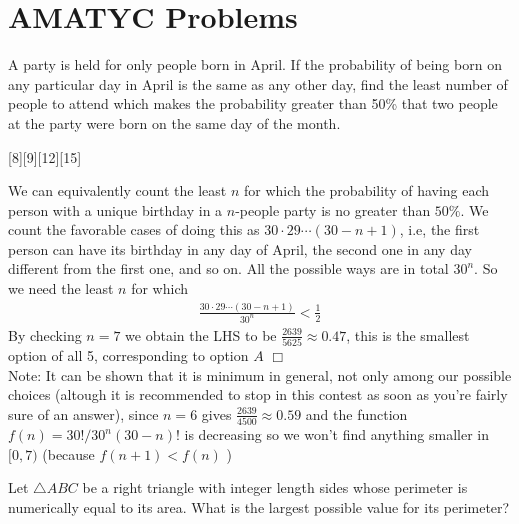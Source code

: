 




\sloppy
\maketitle

\section{AMATYC Problems}

\begin{problem}[A][3][Fall 2016 P13]
    A party is held for only people born in April. If the probability of being born on any particular day in April is the same as any other day, find the least number of people to attend which makes the probability greater than 50\% that two people at the party were born on the same day of the month.
\end{problem}
[8][9][12][15]

\begin{solution}[A]
    We can equivalently count the least $n$ for which the probability of having each person with a unique birthday in a $n$-people party is no greater than $50\%$.
    We count the favorable cases of doing this as $30 \cdot 29 \cdots (30-n+1)$, i.e, the first person can have its birthday in any day of April, the second one in any day different from the first one, and so on. All the possible ways are in total $30^n$. So we need the least $n$ for which
    \begin{align*}
        \frac{30 \cdot 29 \cdots (30-n+1)}{30^n} < \frac{1}{2}
    \end{align*}
    By checking $n=7$ we obtain the LHS to be $\frac{2639}{5625} \approx 0.47$, this is the smallest option of all 5, corresponding to option $A$ $\Box$ \\[3mm]
    Note: It can be shown that it is minimum in general, not only among our possible choices (altough it is recommended to stop in this contest as soon as you're fairly sure of an answer), since  $n=6$ gives $\frac{2639}{4500} \approx 0.59$ and the function $f(n) = 30!/30^n(30-n)!$ is decreasing so we won't find anything smaller in $[0,7)$ (because $f(n+1) < f(n)$ )
\end{solution}

\begin{problem}[A][4][Fall 2015 P11]
    Let $\triangle ABC$ be a right triangle with integer length sides whose perimeter is numerically equal to its area. What is the largest possible value for its perimeter?
\end{problem}


